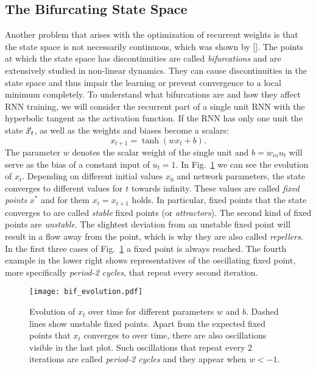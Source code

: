 \subsection{The Bifurcating State Space}%
\label{sub:the_bifurcating_state_space}

Another problem that arises with the optimization of recurrent weights is that
the state space is not necessarily continuous, which was shown by
[\cite{doya1992}].  The points at which the state space has discontinuities are
called \emph{bifurcations} and are extensively studied in non-linear dynamics.
They can cause discontinuities in the state space and thus impair the learning
or prevent convergence to a local minimum completely.  To understand what
bifurcations are and how they affect RNN training, we will consider the
recurrent part of a single unit RNN with the hyperbolic tangent as the
activation function.  If the RNN has only one unit the state $\vec{x}_t$, as well
as the weights and biases become a scalars:
\begin{equation}
  \label{eq:single_unit_rnn}
  x_{t+1} = \tanh(w x_t + b).
\end{equation}
The parameter $w$ denotes the scalar weight of the single unit and $b = w_{in}
u_t$ will serve as the bias of a constant input of $u_t = 1$.  In
Fig.~\ref{fig:bif_evolution} we can see the evolution of $x_t$.  Depending on
different initial values $x_0$ and network parameters, the state converges to
different values for $t$ towards infinity. These values are called \emph{fixed
points} $x^*$ and for them $x_t = x_{t+1}$ holds.  In particular, fixed points
that the state converges to are called \emph{stable} fixed points (or
\emph{attractors}).  The second kind of fixed points are \emph{unstable}.  The
slightest deviation from an unstable fixed point will result in a flow away
from the point, which is why they are also called \emph{repellers}.  In the
first three cases of Fig.~\ref{fig:bif_evolution} a fixed point is always
reached. The fourth example in the lower right shows representatives of
the oscillating fixed point, more specifically \emph{period-2 cycles}, that
repeat every second iteration.
\begin{figure}
  \centering
  \texttt{[image: bif\_evolution.pdf]}
  \caption{Evolution of $x_t$ over time for different parameters $w$ and $b$.
    Dashed lines show unstable fixed points. Apart from the expected fixed points
    that $x_t$ converges to over time, there are also oscillations visible in
    the last plot. Such oscillations that repeat every 2 iterations are called
    \emph{period-2 cycles} and they appear when $w<-1$.}
  \label{fig:bif_evolution}
\end{figure}
